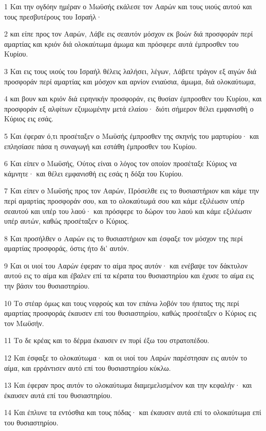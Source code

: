\par 1 Και την ογδόην ημέραν ο Μωϋσής εκάλεσε τον Ααρών και τους υιούς αυτού και τους πρεσβυτέρους του Ισραήλ·
\par 2 και είπε προς τον Ααρών, Λάβε εις σεαυτόν μόσχον εκ βοών διά προσφοράν περί αμαρτίας και κριόν διά ολοκαύτωμα άμωμα και πρόσφερε αυτά έμπροσθεν του Κυρίου.
\par 3 Και εις τους υιούς του Ισραήλ θέλεις λαλήσει, λέγων, Λάβετε τράγον εξ αιγών διά προσφοράν περί αμαρτίας και μόσχον και αρνίον ενιαύσια, άμωμα, διά ολοκαύτωμα,
\par 4 και βουν και κριόν διά ειρηνικήν προσφοράν, εις θυσίαν έμπροσθεν του Κυρίου, και προσφοράν εξ αλφίτων εζυμωμένην μετά ελαίου· διότι σήμερον θέλει εμφανισθή ο Κύριος εις εσάς.
\par 5 Και έφεραν ό,τι προσέταξεν ο Μωϋσής έμπροσθεν της σκηνής του μαρτυρίου· και επλησίασε πάσα η συναγωγή και εστάθη έμπροσθεν του Κυρίου.
\par 6 Και είπεν ο Μωϋσής, Ούτος είναι ο λόγος τον οποίον προσέταξε Κύριος να κάμνητε· και θέλει εμφανισθή εις εσάς η δόξα του Κυρίου.
\par 7 Και είπεν ο Μωϋσής προς τον Ααρών, Πρόσελθε εις το θυσιαστήριον και κάμε την περί αμαρτίας προσφοράν σου, και το ολοκαύτωμά σου και κάμε εξιλέωσιν υπέρ σεαυτού και υπέρ του λαού· και πρόσφερε το δώρον του λαού και κάμε εξιλέωσιν υπέρ αυτών, καθώς προσέταξεν ο Κύριος.
\par 8 Και προσήλθεν ο Ααρών εις το θυσιαστήριον και έσφαξε τον μόσχον της περί αμαρτίας προσφοράς, όστις ήτο δι' αυτόν.
\par 9 Και οι υιοί του Ααρών έφεραν το αίμα προς αυτόν· και ενέβαψε τον δάκτυλον αυτού εις το αίμα και έβαλεν επί τα κέρατα του θυσιαστηρίου και έχυσε το αίμα εις την βάσιν του θυσιαστηρίου.
\par 10 Το στέαρ όμως και τους νεφρούς και τον επάνω λοβόν του ήπατος της περί αμαρτίας προσφοράς έκαυσεν επί του θυσιαστηρίου, καθώς προσέταξεν ο Κύριος εις τον Μωϋσήν.
\par 11 Το δε κρέας και το δέρμα έκαυσεν εν πυρί έξω του στρατοπέδου.
\par 12 Και έσφαξε το ολοκαύτωμα· και οι υιοί του Ααρών παρέστησαν εις αυτόν το αίμα, και ερράντισεν αυτό επί του θυσιαστηρίου κύκλω.
\par 13 Και έφεραν προς αυτόν το ολοκαύτωμα διαμεμελισμένον και την κεφαλήν· και έκαυσεν αυτά επί του θυσιαστηρίου.
\par 14 Και έπλυνε τα εντόσθια και τους πόδας· και έκαυσεν αυτά επί το ολοκαύτωμα επί του θυσιαστηρίου.

